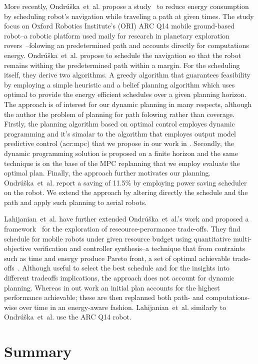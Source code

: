 More recently, Ondr\'{u}\v{s}ka~et~al. propose a study~\citep{ondruska2015scheduled} to reduce energy consumption by scheduling robot's navigation while traveling a path at given times. The study focus on Oxford  Robotics  Institute's (ORI) ARC Q14 mobile ground-based robot--a robotic platform used maily for research in planetary exploration rovers~\citep{yeomans2017murfi}--folowing an predetermined path and accounts directly for computations energy. Ondr\'{u}\v{s}ka~et~al. propose to schedule the navigation so that the robot remains withing the predetermined path within a margin. For the scheduling itself, they derive two algorithms. A greedy algorithm that guarantees feasibility by employing a simple heuristic and a belief planning algorithm which uses optimal to provide the energy efficient schedules over a given planning horizon. The approach is of interest for our dynamic planning in many respects, although the author the problem of planning for path folowing rather than coverage. Firstly, the planning algorithm based on optimal control employes dynamic programming and it's simalar to the algorithm that employes output model predictive control (\Gls{acr:mpc}) that we propose in our work in . Secondly, the dynamic programming solution is proposed on a finite horizon and the same technique is on the base of the MPC replanning that we employ evaluate the optimal plan. Finally, the approach further motivates our planning. Ondr\'{u}\v{s}ka~et~al. report a saving of 11.5\% by employing power saving scheduler on the robot. We extend the approach by altering directly the schedule and the path and apply such planning to aerial robots.

Lahijanian~et~al. have further extended Ondr\'{u}\v{s}ka~et~al.'s work and proposed a framework~\citep{lahijanian2018resource} for the exploration of reseource-perormance trade-offs. They find schedule for mobile robots under given resource budget using quantitative multi-objective verification and controller synthesis--a technique that from contraints such as time and energy produce Pareto front, a set of optimal achievable trade-offs~\citep{forejt2012pareto}. Although useful to select the best schedule and for the insights into different tradeoffs implications, the approach does not account for dynamic planning. Whereas in out work an initial plan accounts for the highest performance achievable; these are then replanned both path- and computations-wise over time in an energy-aware fashion. Lahijanian~et~al. similarly to Ondr\'{u}\v{s}ka~et~al. use the ARC Q14 robot.

\section{\color{red}Summary}

